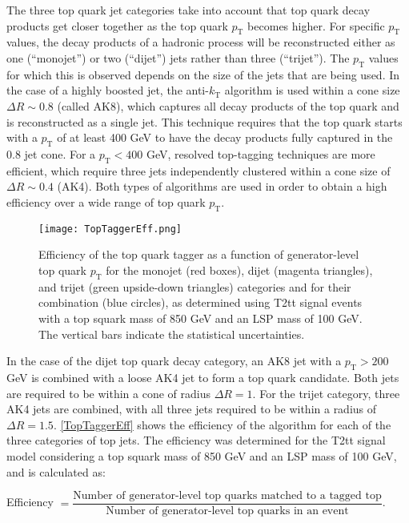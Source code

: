 The three top quark jet categories take into account that top quark decay products get closer together as the top quark $p_\text{T}$ becomes higher. For specific $p_\text{T}$ values, the decay products of a hadronic process will be reconstructed either as one (``monojet'') or two (``dijet'') jets rather than three (``trijet''). The $p_\text{T}$ values for which this is observed depends on the size of the jets that are being used. In the case of a highly boosted jet, the anti-$k_\text{T}$ algorithm is used within a cone size $\Delta R \sim 0.8$ (called AK8), which captures all decay products of the top quark and is reconstructed as a single jet. This technique requires that the top quark starts with a $p_\text{T}$ of at least 400 GeV to have the decay products fully captured in the 0.8 jet cone. For a $p_\text{T} < 400$ GeV, resolved top-tagging techniques are more efficient, which require three jets independently clustered within a cone size of $\Delta R \sim 0.4$ (AK4). Both types of algorithms are used in order to obtain a high efficiency over a wide range of top quark $p_\text{T}$.

\begin{figure}[H]
\begin{center}
\texttt{[image: TopTaggerEff.png]} 
\caption{Efficiency of the top quark tagger as a function of generator-level top quark $p_\text{T}$ for the monojet (red boxes), dijet (magenta triangles), and trijet (green upside-down triangles) categories and for their combination (blue circles), as determined using T2tt signal events with a top squark mass of 850 GeV and an LSP mass of 100 GeV. The vertical bars indicate the statistical uncertainties.}
\label{TopTaggerEff} 
\end{center}
\end{figure}

In the case of the dijet top quark decay category, an AK8 jet with a $p_\text{T} > 200$ GeV is combined with a loose AK4 jet to form a top quark candidate. Both jets are required to be within a cone of radius $\Delta R = 1$. For the trijet category, three AK4 jets are combined, with all three jets required to be within a radius of $\Delta R = 1.5$. \autoref{TopTaggerEff} shows the efficiency of the algorithm for each of the three categories of top jets. The efficiency was determined for the T2tt signal model considering a top squark mass of 850 GeV and an LSP mass of 100 GeV, and is calculated as:
\begin{center}
Efficiency $= \dfrac{\text{Number of generator-level top quarks matched to a tagged top}}{\text{Number of generator-level top quarks in an event}}$.
\end{center}


